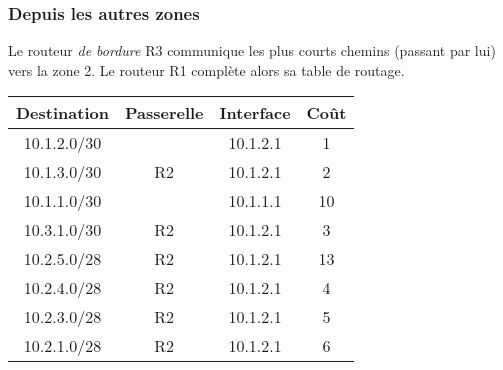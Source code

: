 \documentclass[svgnames,11pt]{beamer}
\begin{document}
\begin{frame}
\begin{center}
    \end{center}

\end{frame}
\begin{frame}
    \frametitle{Depuis les autres zones}
    Le routeur \emph{de bordure} R3 communique les plus courts chemins (passant par lui) vers la zone 2. Le routeur R1 complète alors sa table de routage.
    \begin{center}
        \begin{tabular}{|*{4}{c|}}
            \hline
            Destination & Passerelle    & Interface & Coût \\
            \hline
            10.1.2.0/30 &               & 10.1.2.1  & 1    \\
            \hline
            10.1.3.0/30 & R2 & 10.1.2.1  & 2    \\
            \hline
            10.1.1.0/30 &               & 10.1.1.1  & 10   \\
            \hline
            10.3.1.0/30 & R2 & 10.1.2.1  & 3    \\
            \hline
            10.2.5.0/28 & R2 & 10.1.2.1  & 13   \\
            \hline
            10.2.4.0/28 & R2 & 10.1.2.1  & 4    \\
            \hline
            10.2.3.0/28 & R2 & 10.1.2.1  & 5    \\
            \hline
            10.2.1.0/28 & R2 & 10.1.2.1  & 6    \\
            \hline
        \end{tabular}
    \end{center}


\end{frame}
\end{document}
